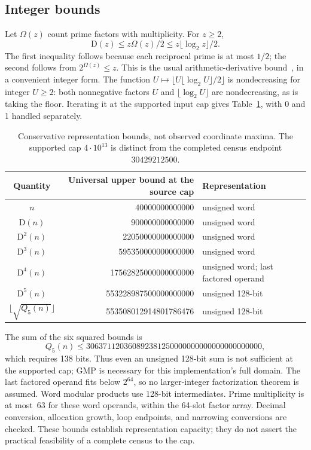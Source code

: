 \documentclass[11pt,a4paper]{article}
\newcommand{\D}{\mathrm{D}}
\theoremstyle{definition}
\theoremstyle{remark}
\begin{document}
\subsection{Integer bounds}
Let $\Omega(z)$ count prime factors with multiplicity. For $z\ge2$,
\begin{equation}\label{eq:width}
 \D(z)\le z\Omega(z)/2\le z\lfloor\log_2 z\rfloor/2.
\end{equation}
The first inequality follows because each reciprocal prime is at most
$1/2$; the second follows from $2^{\Omega(z)}\le z$.
This is the usual arithmetic-derivative bound~\cite{ufnarovski}, in a
convenient integer form. The function
$U\mapsto\lfloor U\lfloor\log_2 U\rfloor/2\rfloor$ is nondecreasing
for integer $U\ge2$: both nonnegative factors $U$ and
$\lfloor\log_2 U\rfloor$ are nondecreasing, as is taking the floor. Iterating it at the supported input cap gives
Table~\ref{tab:bounds}, with 0 and 1 handled separately.

\begin{table}[htbp]
\centering\small
\begin{tabular}{crl}
\toprule
Quantity & Universal upper bound at the source cap & Representation\\
\midrule
$n$ &40000000000000&unsigned word\\
$\D(n)$ &900000000000000&unsigned word\\
$\D^2(n)$ &22050000000000000&unsigned word\\
$\D^3(n)$ &595350000000000000&unsigned word\\
$\D^4(n)$ &17562825000000000000&unsigned word; last factored operand\\
$\D^5(n)$ &553228987500000000000&unsigned 128-bit\\
$\lfloor\sqrt{Q_5(n)}\rfloor$ &553508012914801786476&unsigned 128-bit\\
\bottomrule
\end{tabular}
\caption{Conservative representation bounds, not observed coordinate maxima.
The supported cap $4\cdot10^{13}$ is distinct from the completed census
endpoint $30429212500$.}\label{tab:bounds}
\end{table}

The sum of the six squared bounds is
\[
 Q_5(n)\le306371120360892381250000000000000000000000,
\]
which requires 138 bits. Thus even an unsigned 128-bit sum is not
sufficient at the supported cap; GMP is necessary for this implementation's
full domain. The last factored operand fits below $2^{64}$, so no
larger-integer factorization theorem is assumed. Word modular products
use 128-bit intermediates. Prime multiplicity is at most~63 for these
word operands, within the 64-slot factor array. Decimal conversion,
allocation growth, loop endpoints, and narrowing conversions are checked.
These bounds establish representation capacity; they do not assert the
practical feasibility of a complete census to the cap.
\end{document}

